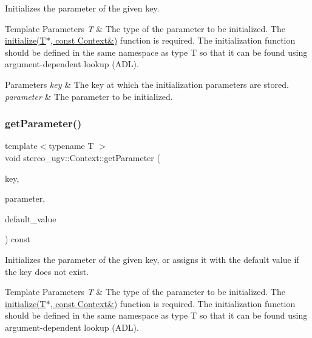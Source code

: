 Initializes the parameter of the given key. 


\begin{DoxyTemplParams}{Template Parameters}
{\em T} & The type of the parameter to be initialized. The \hyperlink{namespacestereo__ugv_a6971cc11001fdf589a71f6fb3099c65b}{initialize(\+T$\ast$, const Context\&)} function is required. The initialization function should be defined in the same namespace as type T so that it can be found using argument-\/dependent lookup (A\+DL). \\
\hline
\end{DoxyTemplParams}

\begin{DoxyParams}{Parameters}
{\em key} & The key at which the initialization parameters are stored. \\
\hline
{\em parameter} & The parameter to be initialized. \\
\hline
\end{DoxyParams}
\mbox{\label{classstereo__ugv_1_1Context_a8e7e25d1efa5c92a84830824c0effa27}} 
\subsubsection{\texorpdfstring{get\+Parameter()}{getParameter()}\hspace{0.1cm}{\footnotesize\ttfamily [2/2]}}
{\footnotesize\ttfamily template$<$typename T $>$ \\
void stereo\+\_\+ugv\+::\+Context\+::get\+Parameter (\begin{DoxyParamCaption}\item[{const std\+::string \&}]{key,  }\item[{T $\ast$}]{parameter,  }\item[{const T \&}]{default\+\_\+value }\end{DoxyParamCaption}) const\hspace{0.3cm}{\ttfamily [inline]}}



Initializes the parameter of the given key, or assigns it with the default value if the key does not exist. 


\begin{DoxyTemplParams}{Template Parameters}
{\em T} & The type of the parameter to be initialized. The \hyperlink{namespacestereo__ugv_a6971cc11001fdf589a71f6fb3099c65b}{initialize(\+T$\ast$, const Context\&)} function is required. The initialization function should be defined in the same namespace as type T so that it can be found using argument-\/dependent lookup (A\+DL). \\
\hline
\end{DoxyTemplParams}

